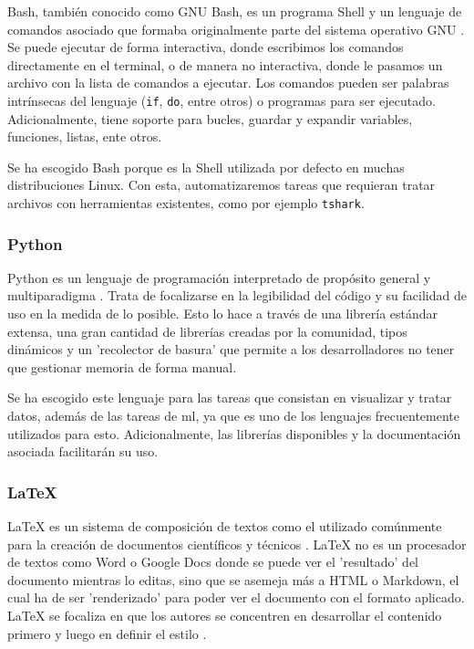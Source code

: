 Bash, también conocido como GNU Bash, es un programa Shell y un lenguaje de comandos asociado que formaba originalmente parte del sistema operativo GNU \cite{gnubashweb} \cite{gnubashmanual}. Se puede ejecutar de forma interactiva, donde escribimos los comandos directamente en el terminal, o de manera no interactiva, donde le pasamos un archivo con la lista de comandos a ejecutar. Los comandos pueden ser palabras intrínsecas del lenguaje (\texttt{if}, \texttt{do}, entre otros) o programas para ser ejecutado. Adicionalmente, tiene soporte para bucles, guardar y expandir variables, funciones, listas, ente otros.

Se ha escogido Bash porque es la Shell utilizada por defecto en muchas distribuciones Linux. Con esta, automatizaremos tareas que requieran tratar archivos con herramientas existentes, como por ejemplo \texttt{tshark}.

\subsubsection{Python}

Python es un lenguaje de programación interpretado de propósito general y multiparadigma \cite{aboutpython} \cite{davepython}. Trata de focalizarse en la legibilidad del código y su facilidad de uso en la medida de lo posible. Esto lo hace a través de una librería estándar extensa, una gran cantidad de librerías creadas por la comunidad, tipos dinámicos y un 'recolector de basura' que permite a los desarrolladores no tener que gestionar memoria de forma manual.

Se ha escogido este lenguaje para las tareas que consistan en visualizar y tratar datos, además de las tareas de \gls{ml}, ya que es uno de los lenguajes frecuentemente utilizados para esto. Adicionalmente, las librerías disponibles y la documentación asociada facilitarán su uso.

\subsubsection{LaTeX}

LaTeX es un sistema de composición de textos como el utilizado comúnmente para la creación de documentos científicos y técnicos \cite{latexweb}. LaTeX no es un procesador de textos como Word o Google Docs donde se puede ver el 'resultado' del documento mientras lo editas, sino que se asemeja más a HTML o Markdown, el cual ha de ser 'renderizado' para poder ver el documento con el formato aplicado. LaTeX se focaliza en que los autores se concentren en desarrollar el contenido primero y luego en definir el estilo \cite{latexabout}.

